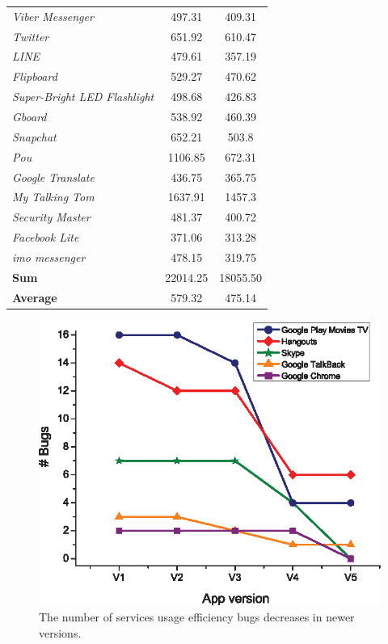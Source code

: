 \documentclass[conference]{IEEEtran}
\begin{document}
\begin{table}
\begin{tabular}{|l|cc|}
{\it Viber Messenger}&497.31&409.31\\
{\it Twitter}&651.92&610.47\\
{\it LINE}&479.61&357.19\\
{\it Flipboard}&529.27&470.62\\
{\it Super-Bright LED Flashlight}&498.68&426.83\\
{\it Gboard}&538.92&460.39\\
{\it Snapchat}&652.21&503.8\\
{\it Pou}&1106.85&672.31\\
{\it Google Translate}&436.75&365.75\\
{\it My Talking Tom}&1637.91&1457.3\\
{\it Security Master}&481.37&400.72\\
{\it Facebook Lite}&371.06&313.28\\
{\it imo messenger}&478.15&319.75\\
\hline
{\bf Sum}&22014.25&18055.50\\
\hline
{\bf Average}&579.32&475.14\\
\hline
\end{tabular}
\label{tab_energy}
\end{table}



 \begin{figure}
 \centering
  \includegraphics[scale=1.0]{bugs-vs-versions.eps}
 \caption{The number of services usage efficiency bugs decreases in newer versions.}
\label{fig_bugsvsversions}
\end{figure}
\end{document}
